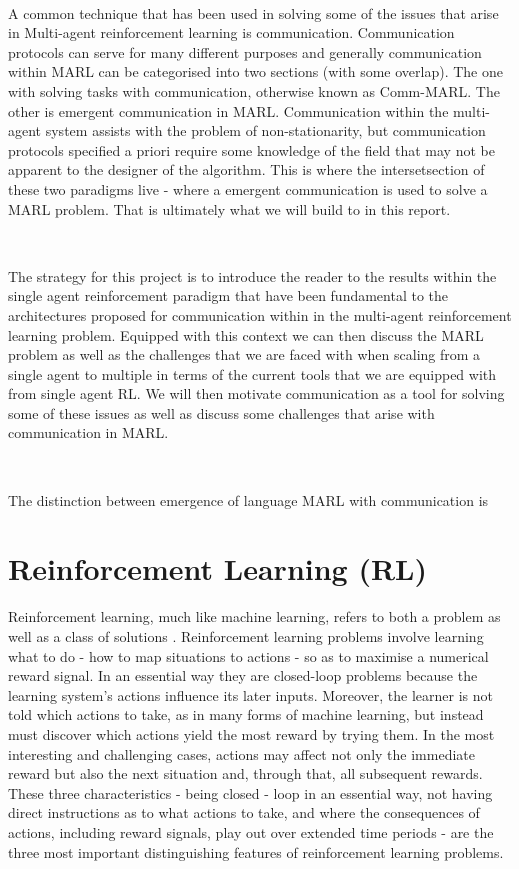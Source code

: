 \documentclass{article}
\begin{document}
\

A common technique that has been used in solving some of the issues that arise in Multi-agent reinforcement learning is communication. Communication protocols can serve for many different purposes and generally communication within MARL can be categorised into two sections (with some overlap). The one with solving tasks with communication, otherwise known as Comm-MARL. The other is emergent communication in MARL. Communication within the multi-agent system assists with the problem of non-stationarity, but communication protocols specified a priori require some knowledge of the field that may not be apparent to the designer of the algorithm. This is where the intersetsection of these two paradigms live - where a emergent communication is used to solve a MARL problem. That is ultimately what we will build to in this report.

\

The strategy for this project is to introduce the reader to the results within the single agent reinforcement paradigm that have been fundamental to the architectures proposed for communication within in the multi-agent reinforcement learning problem. Equipped with this context we can then discuss the MARL problem as well as the challenges that we are faced with when scaling from a single agent to multiple in terms of the current tools that we are equipped with from single agent RL. We will then motivate communication as a tool for solving some of these issues as well as discuss some challenges that arise with communication in MARL.

\

The distinction between emergence of language MARL with communication is 

\newpage

\section{Reinforcement Learning (RL)}

Reinforcement learning, much like machine learning, refers to both a problem as well as a class of solutions \citep{sutton2018reinforcement}. Reinforcement learning problems involve learning what to do - how to map situations to actions - so as to maximise a numerical reward signal. In an essential way they are closed-loop problems because the learning system’s actions influence its later inputs. Moreover, the learner is not told which actions to take, as in many forms of machine learning, but instead must discover which actions yield the most reward by trying them. In the most interesting and challenging cases, actions may affect not only the immediate reward but also the next situation and, through that, all subsequent rewards. These three characteristics - being closed - loop in an essential way, not having direct instructions as to what actions to take, and where the consequences of actions, including reward signals, play out over extended time periods - are the three most important distinguishing features of reinforcement learning problems.
\end{document}
